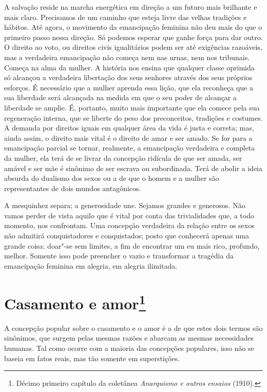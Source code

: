 A salvação reside na marcha energética em direção a um futuro mais
brilhante e mais claro. Precisamos de um caminho que esteja livre das
velhas tradições e hábitos. Até agora, o movimento da emancipação
feminina não deu mais do que o primeiro passo nessa direção. Só podemos
esperar que ganhe força para dar outro. O direito ao voto, ou direitos
civis igualitários podem ser até exigências razoáveis, mas a verdadeira
emancipação não começa nem nas urnas, nem nos tribunais. Começa na alma
da mulher. A história nos ensina que qualquer classe oprimida só
alcançou a verdadeira libertação dos seus senhores através dos seus
próprios esforços. É necessário que a mulher aprenda essa lição, que ela
reconheça que a sua liberdade será alcançada na medida em que o seu
poder de alcançar a liberdade se amplie. É, portanto, muito mais
importante que ela comece pela sua regeneração interna, que se liberte
do peso dos preconceitos, tradições e costumes. A demanda por direitos
iguais em qualquer área da vida é justa e correta; mas, ainda assim, o
direito mais vital é o direito de amar e ser amado. Se for para a
emancipação parcial se tornar, realmente, a emancipação verdadeira e
completa da mulher, ela terá de se livrar da concepção ridícula de que
ser amada, ser amável e ser mãe é sinônimo de ser escrava ou
subordinada. Terá de abolir a ideia absurda do dualismo dos sexos ou a
de que o homem e a mulher são representantes de dois mundos antagônicos.

A mesquinhez separa; a generosidade une. Sejamos grandes e generosos.
Não vamos perder de vista aquilo que é vital por conta das trivialidades
que, a todo momento, nos confrontam. Uma concepção verdadeira da relação
entre os sexos não admitirá conquistadores e conquistados; posto que
conhecerá apenas uma grande coisa: doar"-se sem limites, a fim de
encontrar um eu mais rico, profundo, melhor. Somente isso pode preencher
o vazio e transformar a tragédia da emancipação feminina em alegria, em
alegria ilimitada.

\chapter{Casamento e amor\footnote{Décimo primeiro capítulo da coletânea
  \emph{Anarquismo e outros ensaios} (1910).}}

A concepção popular sobre o casamento e o amor é a de que estes dois
termos são sinônimos, que surgem pelas mesmas razões e abarcam as mesmas
necessidades humanas. Tal como ocorre com a maioria das concepções
populares, isso não se baseia em fatos reais, mas tão somente em
superstições.

